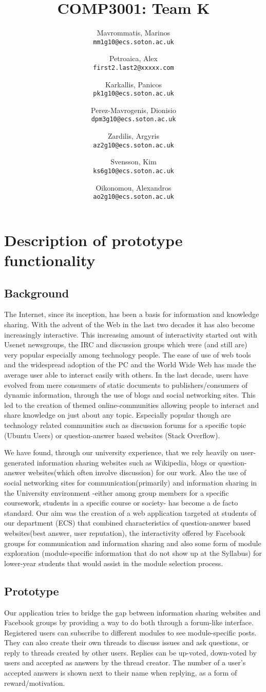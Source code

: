 \documentclass[12pt,a4paper,titlepage]{article}
\author{
  Mavrommatis, Marinos\\ 
\texttt{mm1g10@ecs.soton.ac.uk}
\and
Petroaica, Alex\\ 
\texttt{first2.last2@xxxxx.com}
\and
Karkallis, Panicos\\ 
\texttt{pk1g10@ecs.soton.ac.uk}
\and
Perez-Mavrogenis, Dionisio\\
 \texttt{dpm3g10@ecs.soton.ac.uk}
\and
Zardilis, Argyris\\
 \texttt{az2g10@ecs.soton.ac.uk}
\and
Svensson, Kim\\
 \texttt{ks6g10@ecs.soton.ac.uk}
\and
Oikonomou, Alexandros\\
 \texttt{ao2g10@ecs.soton.ac.uk}
}
\title{COMP3001: Team K}
\begin{document}
\maketitle
\section{Description of prototype functionality}
\subsection{Background}
The Internet, since its inception, has been a basis for information and knowledge sharing. With the advent of the Web in the last two decades it has also become increasingly interactive. This increasing amount of interactivity started out with Usenet newsgroups, the IRC and discussion groups which were (and still are) very popular especially among technology people. The ease of use of web tools and the widespread adoption of the PC and the World Wide Web has made the average user able to interact easily with others. In the last decade, users have evolved from mere consumers of static documents to publishers/consumers of dynamic information, through the use of blogs and social networking sites. This led to the creation of themed online-communities allowing people to interact and share knowledge on just about any topic. Especially popular though are technology related communities such as discussion forums for a specific topic (Ubuntu Users) or question-answer based websites (Stack Overflow).

We have found, through our university experience, that we rely heavily on user-generated information sharing websites such as Wikipedia, blogs or question-answer websites(which often involve discussion) for our work. Also the use of social networking sites for communication(primarily) and information sharing in the University environment -either among group members for a specific coursework, students in a specific course or society- has become a de facto standard. Our aim was the creation of a web application targeted at students of our department (ECS) that combined characteristics of question-answer based websites(best answer, user reputation), the interactivity offered by Facebook groups for communication and information sharing and also some form of module exploration (module-specific information that do not show up at the Syllabus) for lower-year students that would assist in the module selection process.
\subsection{Prototype}
Our application tries to bridge the gap between information sharing websites and Facebook groups by providing a way to do both through a forum-like interface.  Registered users can subscribe to different modules to see module-specific posts. They can also create their own threads to discuss issues and ask questions, or reply to threads created by other users. Replies can be up-voted, down-voted by users and accepted as answers by the thread creator. The number of a user's accepted answers is shown next to their name when replying, as a form of reward/motivation.
\end{document}
